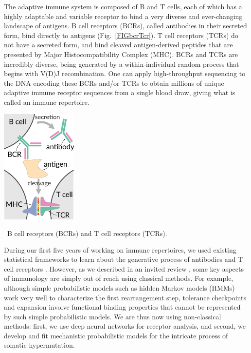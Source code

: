\documentclass[nobib]{tufte-handout}
\begin{document}
The adaptive immune system is composed of B and T cells, each of which has a highly adaptable and variable receptor to bind a very diverse and ever-changing landscape of antigens.
B cell receptors (BCRs), called antibodies in their secreted form, bind directly to antigens (Fig.~\ref{FIGbcrTcr}).
T cell receptors (TCRs) do not have a secreted form, and bind cleaved antigen-derived peptides that are presented by Major Histocompatibility Complex (MHC).
BCRs and TCRs are incredibly diverse, being generated by a within-individual random process that begins with V(D)J recombination.
One can apply high-throughput sequencing to the DNA encoding these BCRs and/or TCRs to obtain millions of unique adaptive immune receptor sequences from a single blood draw, giving what is called an immune repertoire.

\begin{marginfigure}[0.0in]%
\begin{centering}
  \includegraphics[width=1.5in]{bcr-tcr}
\end{centering}
  \caption{\
    B cell receptors (BCRs) and T cell receptors (TCRs).
    }
  \label{FIGbcrTcr}
\end{marginfigure}%

During our first five years of working on immune repertoires, we used existing statistical frameworks to learn about the generative process of antibodies and T cell receptors \cite{McCoy2015-qi, Ralph2016-kr, Ralph2016-yl, Ralph2017-ih, DeWitt2018-el, Dhar2018-ne, Zhang2018-gn, Davidsen2018-gn, DeWitt2018-ar, Simonich2019-nn, Feng2019-sj, Dhar2019-qg}.
However, as we described in an invited review \cite{Olson2018-lw}, some key aspects of immunology are simply out of reach using classical methods.
For example, although simple probabilistic models such as hidden Markov models (HMMs) work very well to characterize the first rearrangement step, tolerance checkpoints and expansion involve functional binding properties that cannot be represented by such simple probabilistic models.
We are thus now using non-classical methods:
first, we use deep neural networks for receptor analysis, and second, we develop and fit mechanistic probabilistic models for the intricate process of somatic hypermutation.
\end{document}
